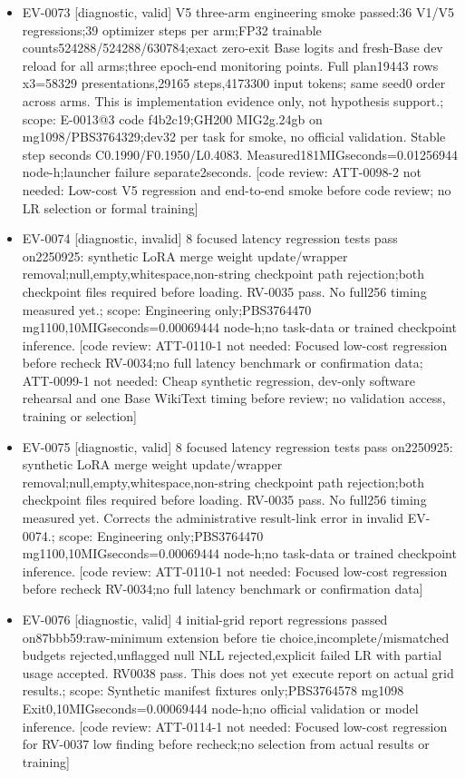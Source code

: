 \documentclass[11pt]{article}
\begin{document}
\begin{itemize}
\item EV-0073 [diagnostic, valid] V5 three-arm engineering smoke passed:36 V1/V5 regressions;39 optimizer steps per arm;FP32 trainable counts524288/524288/630784;exact zero-exit Base logits and fresh-Base dev reload for all arms;three epoch-end monitoring points. Full plan19443 rows x3=58329 presentations,29165 steps,4173300 input tokens; same seed0 order across arms. This is implementation evidence only, not hypothesis support.; scope: E-0013@3 code f4b2c19;GH200 MIG2g.24gb on mg1098/PBS3764329;dev32 per task for smoke, no official validation. Stable step seconds C0.1990/F0.1950/L0.4083. Measured181MIGseconds=0.01256944 node-h;launcher failure separate2seconds. [code review: ATT-0098-2 not needed: Low-cost V5 regression and end-to-end smoke before code review; no LR selection or formal training]
\item EV-0074 [diagnostic, invalid] 8 focused latency regression tests pass on2250925: synthetic LoRA merge weight update/wrapper removal;null,empty,whitespace,non-string checkpoint path rejection;both checkpoint files required before loading. RV-0035 pass. No full256 timing measured yet.; scope: Engineering only;PBS3764470 mg1100,10MIGseconds=0.00069444 node-h;no task-data or trained checkpoint inference. [code review: ATT-0110-1 not needed: Focused low-cost regression before recheck RV-0034;no full latency benchmark or confirmation data; ATT-0099-1 not needed: Cheap synthetic regression, dev-only software rehearsal and one Base WikiText timing before review; no validation access, training or selection]
\item EV-0075 [diagnostic, valid] 8 focused latency regression tests pass on2250925: synthetic LoRA merge weight update/wrapper removal;null,empty,whitespace,non-string checkpoint path rejection;both checkpoint files required before loading. RV-0035 pass. No full256 timing measured yet. Corrects the administrative result-link error in invalid EV-0074.; scope: Engineering only;PBS3764470 mg1100,10MIGseconds=0.00069444 node-h;no task-data or trained checkpoint inference. [code review: ATT-0110-1 not needed: Focused low-cost regression before recheck RV-0034;no full latency benchmark or confirmation data]
\item EV-0076 [diagnostic, valid] 4 initial-grid report regressions passed on87bbb59:raw-minimum extension before tie choice,incomplete/mismatched budgets rejected,unflagged null NLL rejected,explicit failed LR with partial usage accepted. RV0038 pass. This does not yet execute report on actual grid results.; scope: Synthetic manifest fixtures only;PBS3764578 mg1098 Exit0,10MIGseconds=0.00069444 node-h;no official validation or model inference. [code review: ATT-0114-1 not needed: Focused low-cost regression for RV-0037 low finding before recheck;no selection from actual results or training]

\end{itemize}
\end{document}
